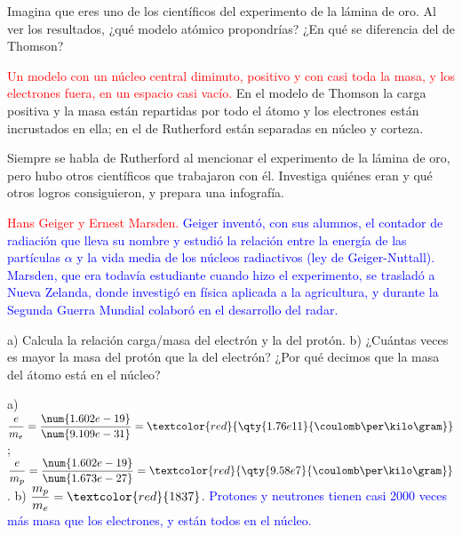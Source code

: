 \begin{exercise}
    Imagina que eres uno de los científicos del experimento de la lámina de oro. Al ver los resultados, ¿qué modelo atómico
    propondrías? ¿En qué se diferencia del de Thomson?
    \begin{solu}
        \textcolor{red}{Un modelo con un núcleo central diminuto, positivo y con casi toda la masa, y los electrones fuera, en un
        espacio casi vacío.} En el modelo de Thomson la carga positiva y la masa están repartidas por todo el átomo y los electrones
        están incrustados en ella; en el de Rutherford están separadas en núcleo y corteza.
    \end{solu}
\end{exercise}

\begin{exercise}
    Siempre se habla de Rutherford al mencionar el experimento de la lámina de oro, pero hubo otros científicos que trabajaron con
    él. Investiga quiénes eran y qué otros logros consiguieron, y prepara una infografía.
    \begin{solu}
        \textcolor{red}{Hans Geiger y Ernest Marsden.} \textcolor{blue}{Geiger inventó, con sus alumnos, el contador de radiación
        que lleva su nombre y estudió la relación entre la energía de las partículas \(\alpha\) y la vida media de los núcleos
        radiactivos (ley de Geiger-Nuttall). Marsden, que era todavía estudiante cuando hizo el experimento, se trasladó a Nueva
        Zelanda, donde investigó en física aplicada a la agricultura, y durante la Segunda Guerra Mundial colaboró en el desarrollo
        del radar.}
    \end{solu}
\end{exercise}

\begin{exercise}
    a) Calcula la relación carga/masa del electrón y la del protón. b) ¿Cuántas veces es mayor la masa del protón que la del
    electrón? ¿Por qué decimos que la masa del átomo está en el núcleo?
    \begin{solu}
        a) \(\dfrac{e}{m_e} = \dfrac{\num{1.602e-19}}{\num{9.109e-31}} = \textcolor{red}{\qty{1.76e11}{\coulomb\per\kilo\gram}}\);
        \(\dfrac{e}{m_p} = \dfrac{\num{1.602e-19}}{\num{1.673e-27}} = \textcolor{red}{\qty{9.58e7}{\coulomb\per\kilo\gram}}\).
        b) \(\dfrac{m_p}{m_e} = \textcolor{red}{1837}\). \textcolor{blue}{Protones y neutrones tienen casi 2000 veces más masa que
        los electrones, y están todos en el núcleo.}
    \end{solu}
\end{exercise}

